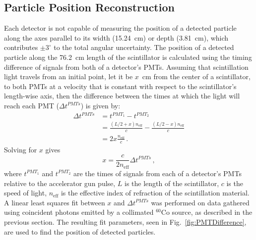 \subsection{Particle Position Reconstruction}
Each detector is not capable of measuring the position of a detected particle along the axes parallel to its width (15.24~cm) or depth (3.81~cm), which contributes $\pm3^{\circ}$ to the total angular uncertainty.
The position of a detected particle along the 76.2~cm length of the scintillator is calculated using the timing difference of signals from both of a detector's PMTs.
Assuming that scintillation light travels from an initial point, let it be $x$~cm from the center of a scintillator, to both PMTs at a velocity that is constant with respect to the scintillator's length-wise axis, then the difference between the times at which the light will reach each PMT ($\Delta t^{PMTs}$) is given by:
\begin{equation}
\label{eq:PMTDiff1}
\begin{split}
\Delta t^{PMTs} & = t^{PMT_1}-t^{PMT_2} \\ 
& = \frac{(L/2 + x) n_{\text{eff}}}{c} - \frac{(L/2-x) n_{\text{eff}}}{c} \\
& = 2x \frac{n_{\text{eff}}}{c}  \, .
\end{split}
\end{equation}
Solving for $x$ gives 
\begin{equation}
\label{eq:position}
x = \frac{c}{2n_{\text{eff}}} \Delta t^{PMTs} \, ,
\end{equation}
where $t^{PMT_{1}}$ and $t^{PMT_{2}}$ are the times of signals from each of a detector's PMTs relative to the accelerator gun pulse, $L$ is the length of the scintillator, $c$ is the speed of light, $n_{\text{eff}}$ is the effective index of refraction of the scintillation material.
A linear least squares  fit between $x$ and $\Delta t^{PMTs}$ was performed on data gathered using coincident photons emitted by a collimated $^{60}$Co source, as described in the previous section.
The resulting fit parameters, seen in Fig.~\ref{fig:PMTDifference}, are used to find the position of detected particles.
